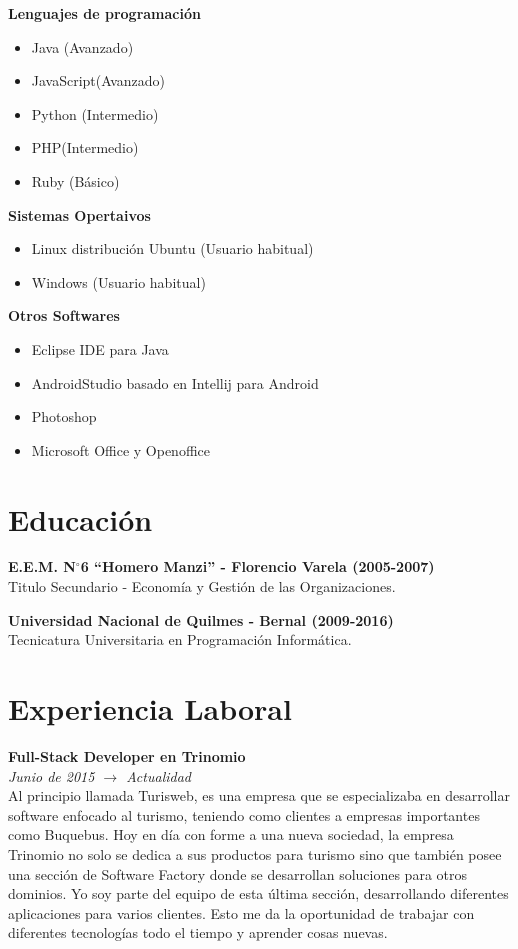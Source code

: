 \documentclass[margin, line, a4paper]{resume}
\begin{document}
\begin{resume}
\begin{multicols}{2}
        \textbf{Lenguajes de programación}
          \begin{itemize}
            \item Java (Avanzado)
            \item JavaScript(Avanzado)
            \item Python (Intermedio)
            \item PHP(Intermedio)
            \item Ruby (Básico) 
          \end{itemize}

        \textbf{Sistemas Opertaivos}
          \begin{itemize}
            \item Linux distribución Ubuntu (Usuario habitual)
            \item Windows (Usuario habitual)
          \end{itemize}
        \textbf{Otros Softwares}
          \begin{itemize}
            \item Eclipse IDE para Java
            \item AndroidStudio basado en Intellij para Android
            \item Photoshop
            \item Microsoft Office y Openoffice
          \end{itemize}
      \end{multicols}

    \section{\mysidestyle Educación}
      \textbf{E.E.M. N$^\circ$6 ``Homero Manzi''  - Florencio Varela (2005-2007)} \\
      Titulo Secundario - Economía y Gestión de las Organizaciones.

      \textbf{Universidad Nacional de Quilmes - Bernal (2009-2016)} \\
      Tecnicatura Universitaria en Programación Informática.

    \section{\mysidestyle Experiencia Laboral}\vspace{1mm}
      \textbf{Full-Stack Developer en Trinomio} \\
      \textit{Junio de 2015 $\rightarrow$ Actualidad} \\
      Al principio llamada Turisweb, es una empresa que se especializaba en desarrollar software enfocado al turismo, teniendo como clientes a empresas importantes como Buquebus. Hoy en día con forme a una nueva sociedad, la empresa Trinomio no solo se dedica a sus productos para turismo sino que también posee una sección de Software Factory donde se desarrollan soluciones para otros dominios. Yo soy parte del equipo de esta última sección, desarrollando diferentes aplicaciones para varios clientes. Esto me da la oportunidad de trabajar con diferentes tecnologías todo el tiempo y aprender cosas nuevas.


\end{resume}
\end{document}
